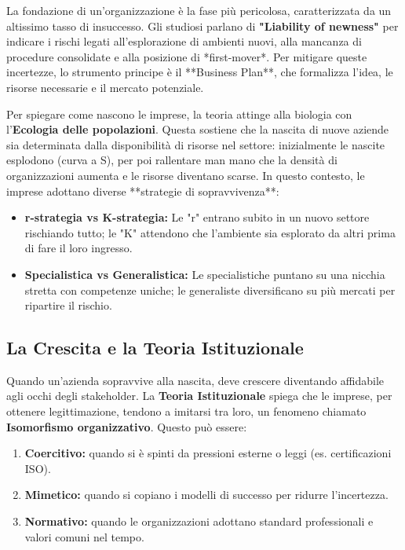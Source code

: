 \documentclass[a4paper,10pt]{article}
\begin{document}
La fondazione di un'organizzazione è la fase più pericolosa, caratterizzata da un altissimo tasso di insuccesso. Gli studiosi parlano di \textbf{"Liability of newness"} per indicare i rischi legati all'esplorazione di ambienti nuovi, alla mancanza di procedure consolidate e alla posizione di *first-mover*. Per mitigare queste incertezze, lo strumento principe è il **Business Plan**, che formalizza l'idea, le risorse necessarie e il mercato potenziale.

Per spiegare come nascono le imprese, la teoria attinge alla biologia con l'\textbf{Ecologia delle popolazioni}. Questa sostiene che la nascita di nuove aziende sia determinata dalla disponibilità di risorse nel settore: inizialmente le nascite esplodono (curva a S), per poi rallentare man mano che la densità di organizzazioni aumenta e le risorse diventano scarse. In questo contesto, le imprese adottano diverse **strategie di sopravvivenza**:
\begin{itemize}
    \item \textbf{r-strategia vs K-strategia:} Le "r" entrano subito in un nuovo settore rischiando tutto; le "K" attendono che l'ambiente sia esplorato da altri prima di fare il loro ingresso.
    \item \textbf{Specialistica vs Generalistica:} Le specialistiche puntano su una nicchia stretta con competenze uniche; le generaliste diversificano su più mercati per ripartire il rischio.
\end{itemize}

\subsection*{La Crescita e la Teoria Istituzionale}

Quando un'azienda sopravvive alla nascita, deve crescere diventando affidabile agli occhi degli stakeholder. La \textbf{Teoria Istituzionale} spiega che le imprese, per ottenere legittimazione, tendono a imitarsi tra loro, un fenomeno chiamato \textbf{Isomorfismo organizzativo}. Questo può essere:
\begin{enumerate}
    \item \textbf{Coercitivo:} quando si è spinti da pressioni esterne o leggi (es. certificazioni ISO).
    \item \textbf{Mimetico:} quando si copiano i modelli di successo per ridurre l'incertezza.
    \item \textbf{Normativo:} quando le organizzazioni adottano standard professionali e valori comuni nel tempo.
\end{enumerate}
\end{document}
